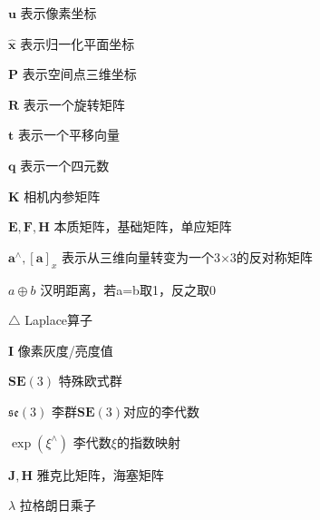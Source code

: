 
\begin{notation}

  \begin{notationlist}{2em}
  	\item[$\displaystyle \boldsymbol{u}$] 表示像素坐标
  	\item[$\displaystyle \hat{\boldsymbol{x}}$] 表示归一化平面坐标
    \item[$\displaystyle \boldsymbol{P}$] 表示空间点三维坐标
    \item[$\displaystyle \boldsymbol{R}$] 表示一个旋转矩阵
    \item[$\displaystyle \boldsymbol{t}$] 表示一个平移向量
	\item[$\displaystyle \boldsymbol{q}$] 表示一个四元数
	\item[$\displaystyle \boldsymbol{K}$] 相机内参矩阵
	\item[$\displaystyle \boldsymbol{E,F,H}$] 本质矩阵，基础矩阵，单应矩阵
	\item[$\displaystyle{\boldsymbol{a}^{\wedge},\left[\boldsymbol{a}\right]_{x}}$] 表示从三维向量转变为一个3$\times$3的反对称矩阵
	\item[$\displaystyle a \oplus b$] 汉明距离，若a=b取1，反之取0
	\item[$\displaystyle \triangle$] Laplace算子
	\item[$\displaystyle \boldsymbol{I}$] 像素灰度/亮度值
	\item[$\displaystyle \boldsymbol{SE}(3)$] 特殊欧式群
	\item[$\displaystyle \mathfrak{se}(3)$] 李群$\boldsymbol{SE}(3)$对应的李代数
	\item[$\displaystyle \exp(\xi^\wedge)$] 李代数$\xi$的指数映射
	\item[$\displaystyle \boldsymbol{J,H}$] 雅克比矩阵，海塞矩阵
	\item[$\displaystyle \lambda$] 拉格朗日乘子
  \end{notationlist}
\end{notation}





